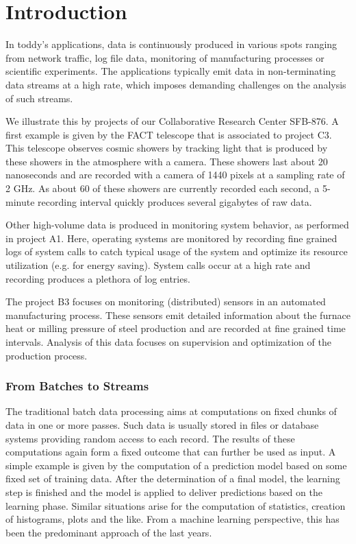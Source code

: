 \section{\label{sec:intro}Introduction}
In toddy's applications, data is continuously produced in various spots
ranging from network traffic, log file data, monitoring of
manufacturing processes or scientific experiments. The applications
typically emit data in non-terminating data streams at a high rate,
which imposes demanding challenges on the analysis of such streams.

We illustrate this by projects of our Collaborative Research Center
SFB-876. A first example is given by the FACT telescope that is
associated to project C3. This telescope observes cosmic showers by
tracking light that is produced by these showers in the atmosphere
with a camera.  These showers last about 20 nanoseconds and are
recorded with a camera of 1440 pixels at a sampling rate of 2 GHz. As
about 60 of these showers are currently recorded each second, a
5-minute recording interval quickly produces several gigabytes of raw
data.

Other high-volume data is produced in monitoring system behavior, as
performed in project A1. Here, operating systems are monitored by
recording fine grained logs of system calls to catch typical usage of
the system and optimize its resource utilization (e.g. for energy
saving). System calls occur at a high rate and recording produces a
plethora of log entries.

The project B3 focuses on monitoring (distributed) sensors in an
automated manufacturing process. These sensors emit detailed
information about the furnace heat or milling pressure of steel production
and are recorded at fine grained time intervals. Analysis of this data
focuses on supervision and optimization of the production process.

\subsubsection*{From Batches to Streams}
The traditional batch data processing aims at computations on fixed
chunks of data in one or more passes. Such data is usually stored in
files or database systems providing random access to each record. The
results of these computations again form a fixed outcome that can
further be used as input. A simple example is given by the computation
of a prediction model based on some fixed set of training data. After
the determination of a final model, the learning step is finished and
the model is applied to deliver predictions based on the learning
phase. Similar situations arise for the computation of statistics,
creation of histograms, plots and the like. From a machine learning
perspective, this has been the predominant approach of the last years.

